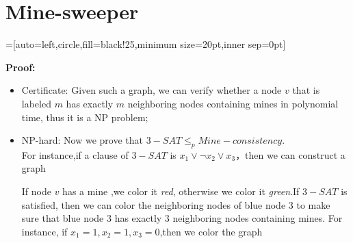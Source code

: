 \section{Mine-sweeper}
=[auto=left,circle,fill=black!25,minimum size=20pt,inner sep=0pt]

\textbf{Proof:} 
\begin{itemize}
	\item Certificate: Given such a graph, we can verify whether a node $v$ that is labeled $m$ has exactly $m$ neighboring nodes containing mines in polynomial time, thus it is a NP problem;
	\item NP-hard: Now we prove that $3-SAT \leq_p Mine-consistency$. \\
	For instance,if a clause of $3-SAT$ is $ x_1 \vee \neg x_2 \vee  x_3 $，then we can construct a graph 
		\begin{center} 
		\end{center} 
	If node $v$ has a mine ,we color it \textit{red}, otherwise we color it \textit{green}.If $3-SAT$ is satisfied, then we can color the neighboring nodes of blue node $3$ to make sure that blue node $3$ has exactly $3$ neighboring nodes containing mines. For instance, if $x_1 = 1, x_2 = 1, x_3 = 0$,then we color the graph 
		\begin{center} 
\end{center}
\end{itemize}
